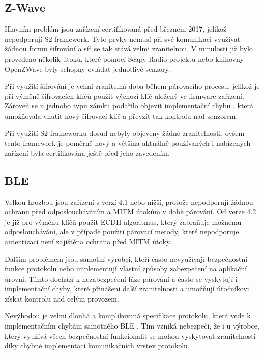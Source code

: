  \subsection{Z-Wave}
 Hlavním problém jsou zařízení certifikovaná před březnem 2017, jelikož nepodporují S2 framework.
 Tyto prvky nemusí při své komunikaci využívat žádnou formu šifrování a síť se tak stává 
 velmi zranitelnou. V minulosti již bylo provedeno několik útoků, které pomocí
 Scapy-Radio projektu \cite{ezwave} nebo knihovny OpenZWave  byly schopny ovládat jednotlivé senzory. 
 
 Při využití šifrování je velmi zranitelná doba během párovacího procesu, jelikož je při výměně
 šifrovacích klíčů použit výchozí klíč uložený ve firmware zařízení. Zároveň se 
 u jednoho typu zámku podařilo objevit implementační chybu \cite{zwave-S0-attack}, která umožňovala vnutit 
 nový šifrovací klíč a převzít tak kontrolu nad senzorem. 
 
 Při využití S2 frameworku dosud nebyly objeveny žádné zranitelnosti, ovšem tento
 framework je poměrně nový a většina aktuálně používaných i nabízených zařízení byla certifikována 
 ještě před jeho zavedením.
 
 \subsection{BLE}
 Velkou hrozbou jsou zařízení s verzí 4.1 nebo nižší, protože nepodporují žádnou ochranu před 
 odposloucháváním a MITM útokům v době párování. Od verze 4.2 je již pro výměnu klíčů použit ECDH 
 algoritmus, který zabraňuje možnému odposlouchávání, ale v případě použití párovací metody, které
 nepodporuje autentizaci není zajištěna ochrana před MITM útoky.  \cite{cesnet-survey}
 
 Dalším problémem jsou samotní výrobci, kteří často nevyužívají bezpečnostní funkce protokolu  \cite{ble-locks} nebo
 implementují vlastní způsoby zabezpečení na aplikační úrovni. Tímto dochází k nezabezpečení fáze 
 párování a často se vyskytují i implementační chyby, které přinášení další zranitelnosti \cite{ble-attack} a
 umožňují útočníkovi získat kontrolu nad celým provozem.  \cite{cesnet-survey}
 
 Nevýhodou je velmi dlouhá a komplikovaná specifikace protokolu, která vede k implementačním 
 chybám samotného BLE \cite{blueborne}. Tím vzniká nebezpečí, že i u výrobce, který využívá
 všech bezpečnostní funkcionalit
 se mohou vyskytovat zranitelnosti díky chybné implementaci komunikačních vrstev protokolu. \cite{cesnet-survey}
 
